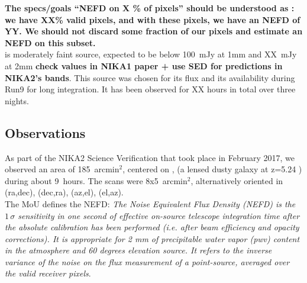 

{\bf The specs/goals ``NEFD on X \% of pixels'' should be understood as : we have
XX\% valid pixels, and with these pixels, we have an NEFD of YY. We should not
discard some fraction of our pixels and estimate an NEFD on this subset.}\\

\hls is moderately faint source, expected to be below 100~mJy at 1mm and
XX~mJy at 2mm {\bf check values in NIKA1 paper + use SED for predictions in
  NIKA2's bands}. This source was chosen for its flux and its availability during
Run9 for long integration. It has been observed for XX hours in total over three
nights.


\subsection{Observations}

As part of the NIKA2 Science Verification that took place in February 2017, we
observed an area of 185~arcmin$^2$, centered on \hls, (a lensed dusty galaxy at
z=5.24 \cite{combes2012}) during about 9~hours. The scans were 8x5~arcmin$^2$,
alternatively oriented in (ra,dec), (dec,ra), (az,el), (el,az).\\

The MoU defines the NEFD:  \emph{The Noise Equivalent Flux Density (NEFD)
  is the $1\,\sigma$ sensitivity in one second of effective on-source telescope
  integration time after the absolute calibration has been performed (i.e. after
  beam efficiency and opacity corrections). It is appropriate for 2 mm of
  precipitable water vapor (pwv) content in the atmosphere and 60 degrees
  elevation source. It refers to the inverse variance of the noise on the flux
  measurement of a point-source, averaged over the valid receiver pixels}.

